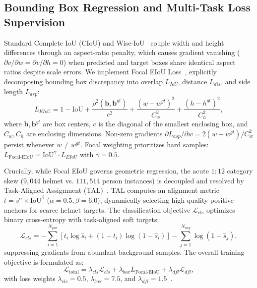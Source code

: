 \documentclass[conference]{IEEEtran}
\begin{document}
\subsection{Bounding Box Regression and Multi-Task Loss Supervision}
\label{subsec:loss}
Standard Complete IoU (CIoU) and Wise-IoU~\cite{tong2023wise} couple width and height differences through an aspect-ratio penalty, which causes gradient vanishing ($\partial v/\partial w = \partial v/\partial h = 0$) when predicted and target boxes share identical aspect ratios despite scale errors. We implement Focal EIoU Loss~\cite{zhang2022focal}, explicitly decomposing bounding box discrepancy into overlap $L_{IoU}$, distance $L_{dis}$, and side length $L_{asp}$:
\begin{equation}
L_{EIoU} = 1 - \text{IoU} + \frac{\rho^2(\mathbf{b}, \mathbf{b}^{gt})}{c^2} + \frac{(w - w^{gt})^2}{C_w^2} + \frac{(h - h^{gt})^2}{C_h^2},
\end{equation}
where $\mathbf{b}, \mathbf{b}^{gt}$ are box centers, $c$ is the diagonal of the smallest enclosing box, and $C_w, C_h$ are enclosing dimensions. Non-zero gradients \mbox{$\partial L_{asp}/\partial w = 2(w - w^{gt})/C_w^2$} persist whenever $w \neq w^{gt}$. Focal weighting prioritizes hard samples: $L_{\text{Focal-EIoU}} = \text{IoU}^\gamma \cdot L_{EIoU}$ with $\gamma = 0.5$.

Crucially, while Focal EIoU governs geometric regression, the acute $1:12$ category skew ($9,044$ helmet vs. $111,514$ person instances) is decoupled and resolved by Task-Aligned Assignment (TAL)~\cite{feng2021tood}. TAL computes an alignment metric \mbox{$t = s^\alpha \times \text{IoU}^\beta$} \mbox{($\alpha=0.5, \beta=6.0$)}, dynamically selecting high-quality positive anchors for scarce helmet targets. The classification objective $\mathcal{L}_{cls}$ optimizes binary cross-entropy with task-aligned soft targets:
\begin{equation}
\mathcal{L}_{cls} = -\sum_{i=1}^{N_{pos}} [t_i \log \hat{s}_i + (1 - t_i) \log(1 - \hat{s}_i)] - \sum_{j=1}^{N_{neg}} \log(1 - \hat{s}_j),
\end{equation}
suppressing gradients from abundant background samples. The overall training objective is formulated as:
\begin{equation}
\mathcal{L}_{\text{total}} = \lambda_{cls} \mathcal{L}_{cls} + \lambda_{box} L_{\text{Focal-EIoU}} + \lambda_{dfl} \mathcal{L}_{dfl},
\end{equation}
with loss weights $\lambda_{cls}=0.5$, $\lambda_{box}=7.5$, and $\lambda_{dfl}=1.5$~\cite{li2020generalized}.
\end{document}
